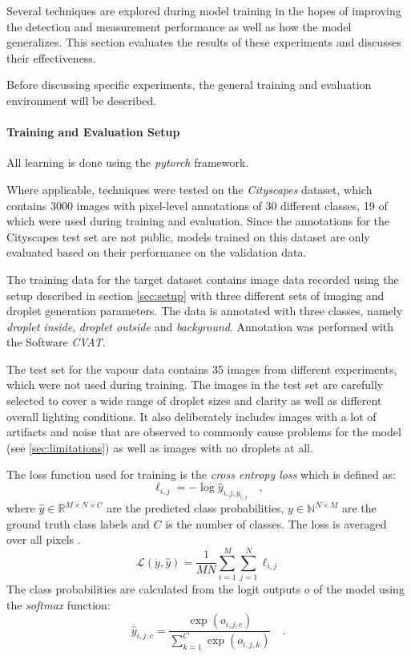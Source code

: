 Several techniques are explored during model training in the hopes of improving the detection and measurement performance as well as how the model generalizes. 
This section evaluates the results of these experiments and discusses their effectiveness.

Before discussing specific experiments, the general training and evaluation environment will be described.

\paragraph*{Training and Evaluation Setup}
All learning is done using the \emph{pytorch}\cite{paszkePyTorchImperativeStyle2019a} framework.

Where applicable, techniques were tested on the \emph{Cityscapes}\cite{cordtsCityscapesDatasetSemantic2016a} dataset, which contains 3000 images with pixel-level annotations of 30 different classes, 19 of which were used during training and evaluation.
Since the annotations for the Cityscapes test set are not public, models trained on this dataset are only evaluated based on their performance on the validation data. 

The training data for the target dataset contains image data recorded using the setup described in section \ref{sec:setup} with three different sets of imaging and droplet generation parameters. The data is annotated with three classes, namely \emph{droplet inside}, \emph{droplet outside} and \emph{background}. Annotation was performed with the Software \emph{CVAT}\cite{CVAT_ai_Corporation_Computer_Vision_Annotation_2022}.

The test set for the vapour data contains 35 images from different experiments, which were not used during training. The images in the test set are carefully selected to cover a wide range of droplet sizes and clarity as well as different overall lighting conditions. It also deliberately includes images with a lot of artifacts and noise that are observed to commonly cause problems for the model (see \ref{sec:limitations}) as well as images with no droplets at all.

The loss function used for training is the \emph{cross entropy loss} which is defined as:
\begin{equation*}
    \ell_{i, j} = -\log\hat{y}_{i, j, y_{i, j}}\quad,
\end{equation*}
where $\hat{y} \in \mathbb{R}^{M \times N \times C}$ are the predicted class probabilities, $y \in \mathbb{N}^{N \times M}$ are the ground truth class labels and $C$ is the number of classes. The loss is averaged over all pixels \cite{CrossEntropyLossPyTorch13}.
\begin{equation*}
    \mathcal{L}(y, \hat{y}) = \frac{1}{MN} \sum_{i=1}^M \sum_{j=1}^N \ell_{i, j}
\end{equation*}
The class probabilities are calculated from the logit outputs $o$ of the model using the \emph{softmax} function:
\begin{equation*}
    \hat{y}_{i, j, c} = \frac{\exp(o_{i, j, c})}{\sum_{k=1}^C \exp(o_{i, j, k})}\quad.
\end{equation*}

